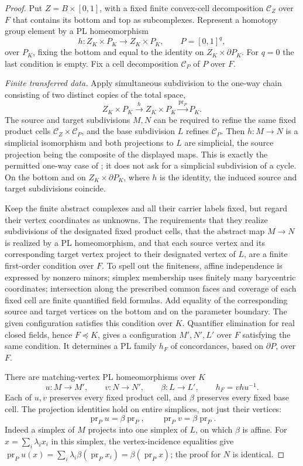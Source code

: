\begin{proof}
Put $Z=B\times[0,1]$, with a fixed finite convex-cell
decomposition $\mathcal C_Z$ over $F$ that contains its bottom
and top as subcomplexes. Represent a homotopy group element by
a PL homeomorphism
\[
 h:Z_K\times P_K\longrightarrow Z_K\times P_K,
 \qquad P=[0,1]^q,
\]
over $P_K$, fixing the bottom and equal to the identity on
$Z_K\times\partial P_K$. For $q=0$ the last condition is empty.
Fix a cell decomposition $\mathcal C_P$ of $P$ over $F$.

\emph{Finite transferred data.}
Apply simultaneous subdivision to the one-way chain consisting
of two distinct copies of the total space,
\[
 Z_K\times P_K\xrightarrow{h}Z_K\times P_K
          \xrightarrow{\operatorname{pr}_P}P_K.
\]
The source and target subdivisions $M,N$ can be required to
refine the same fixed product cells
$\mathcal C_Z\times\mathcal C_P$, and the base subdivision $L$
refines $\mathcal C_P$. Then $h:M\to N$ is a simplicial
isomorphism and both projections to $L$ are simplicial, the
source projection being the composite of the displayed maps.
This is exactly the permitted one-way case of
\cite[Theorems 2.14--2.15, pp.~17--19]{RourkeSanderson1972};
it does not ask for a simplicial subdivision of a cycle.
On the bottom and on $Z_K\times\partial P_K$, where $h$ is
the identity, the induced source and target subdivisions coincide.

Keep the finite abstract complexes and all their carrier labels
fixed, but regard their vertex coordinates as unknowns. The
requirements that they realize subdivisions of the designated
fixed product cells, that the abstract map $M\to N$ is realized
by a PL homeomorphism, and that each source vertex and its
corresponding target vertex project to their designated vertex
of $L$, are a finite first-order condition over $F$. To spell
out the finiteness, affine independence is expressed by nonzero
minors; simplex membership uses finitely many barycentric
coordinates; intersection along the prescribed common faces
and coverage of each fixed cell are finite quantified field
formulas. Add equality of the corresponding source and target
vertices on the bottom and on the parameter boundary. The
given configuration satisfies this condition over $K$.
Quantifier elimination for real closed fields, hence
$F\preccurlyeq K$, gives a configuration $M',N',L'$ over $F$
satisfying the same condition. It determines a PL family
$h_F$ of concordances, based on $\partial P$, over $F$.

There are matching-vertex PL homeomorphisms over $K$
\[
 u:M\longrightarrow M',\qquad
 v:N\longrightarrow N',\qquad
 \beta:L\longrightarrow L',
 \qquad h_F=vhu^{-1}.
\]
Each of $u,v$ preserves every fixed product cell, and $\beta$
preserves every fixed base cell. The projection identities
hold on entire simplices, not just their vertices:
\[
 \operatorname{pr}_P u=\beta\operatorname{pr}_P,\qquad
 \operatorname{pr}_P v=\beta\operatorname{pr}_P.
\]
Indeed a simplex of $M$ projects into one simplex of $L$,
on which $\beta$ is affine. For
$x=\sum_i\lambda_i x_i$ in this simplex, the vertex-incidence
equalities give
$\operatorname{pr}_P u(x)=\sum_i\lambda_i\beta(\operatorname{pr}_P x_i)
=\beta(\operatorname{pr}_P x)$; the proof for $N$ is identical.


\end{proof}
